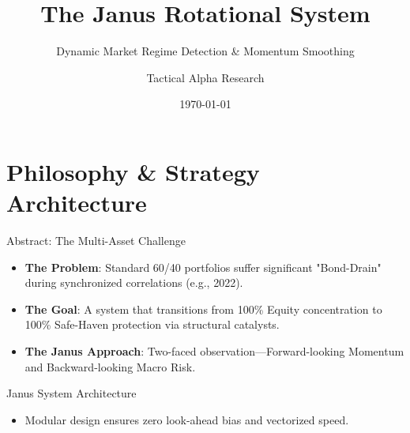 \documentclass[10pt]{beamer}
\title{The Janus Rotational System}
\subtitle{Dynamic Market Regime Detection \& Momentum Smoothing}
\date{\today}
\author{Tactical Alpha Research}
\institute{Academic Portfolio Management Suite}
\begin{document}
\maketitle

\section{Philosophy \& Strategy Architecture}

\begin{frame}{Abstract: The Multi-Asset Challenge}
    \begin{itemize}
        \item \textbf{The Problem}: Standard 60/40 portfolios suffer significant "Bond-Drain" during synchronized correlations (e.g., 2022).
        \item \textbf{The Goal}: A system that transitions from 100\% Equity concentration to 100\% Safe-Haven protection via structural catalysts.
        \item \textbf{The Janus Approach}: Two-faced observation—Forward-looking Momentum and Backward-looking Macro Risk.
    \end{itemize}
\end{frame}

\begin{frame}{Janus System Architecture}
    \begin{center}
    \end{center}
    \begin{itemize}
        \item Modular design ensures zero look-ahead bias and vectorized speed.
    \end{itemize}
\end{frame}
\end{document}
